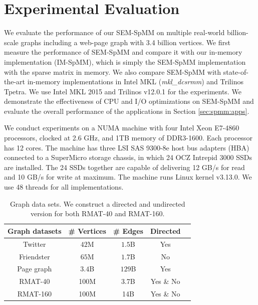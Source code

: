 \section{Experimental Evaluation}

We evaluate the performance of our SEM-SpMM on multiple real-world billion-scale
graphs including a web-page graph with 3.4 billion vertices. We first measure
the performance of SEM-SpMM and compare it with our in-memory implementation
(IM-SpMM), which is simply the SEM-SpMM implementation with the sparse matrix
in memory. 
We also compare SEM-SpMM with state-of-the-art in-memory implementations in
Intel MKL (\textit{mkl\_dcsrmm}) and Trilinos Tpetra. We use Intel MKL 2015
and Trilinos v12.0.1 for the experiments. We demonstrate the effectiveness of
CPU and I/O optimizations on SEM-SpMM and evaluate the overall performance
of the applications in Section \ref{sec:spmm:apps}.

We conduct experiments on a NUMA machine with
four Intel Xeon E7-4860 processors, clocked at 2.6 GHz, and 1TB memory of
DDR3-1600. Each processor has 12 cores. The machine has three LSI SAS 9300-8e
host bus adapters (HBA) connected to a SuperMicro storage chassis, in which
24 OCZ Intrepid 3000 SSDs are installed. The 24 SSDs together are capable of
delivering 12 GB/s for read and 10 GB/s for write at maximum. The machine runs
Linux kernel v3.13.0. We use 48 threads for all implementations.

\begin{table}
\begin{center}
\footnotesize
\begin{tabular}{|c|c|c|c|c|}
\hline
Graph datasets & \# Vertices & \# Edges & Directed \\
\hline
Twitter \cite{twitter} & $42$M & $1.5$B & Yes \\
\hline
Friendster \cite{friendster} & $65$M & $1.7$B & No \\
\hline
Page graph \cite{web_graph} & $3.4$B & $129$B & Yes \\
\hline
RMAT-40 \cite{rmat} & 100M & 3.7B & Yes \& No \\
\hline
RMAT-160 \cite{rmat} & 100M & 14B & Yes \& No \\
\hline
\end{tabular}
\normalsize
\end{center}
\caption{Graph data sets. We construct a directed and undirected version for
both RMAT-40 and RMAT-160.}
\label{graphs}
\end{table}

